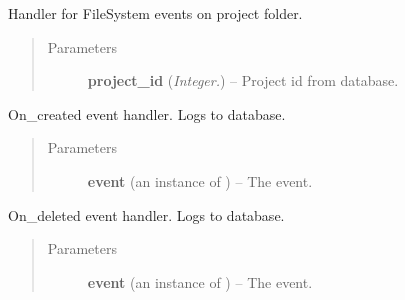 \documentclass[letterpaper,10pt,english]{sphinxmanual}
\begin{document}
\begin{fulllineitems}
\label{api:controller.PROJECT_FILE_EVENT_HANDLER}
Handler for FileSystem events on project folder.
\begin{quote}\begin{description}
\item[{Parameters}] \leavevmode
\textbf{project\_id} (\emph{Integer.}) -- Project id from database.

\end{description}\end{quote}

\begin{fulllineitems}
\label{api:controller.PROJECT_FILE_EVENT_HANDLER.on_created}
On\_created event handler. Logs to database.
\begin{quote}\begin{description}
\item[{Parameters}] \leavevmode
\textbf{event} (an instance of ) -- The event.

\end{description}\end{quote}

\end{fulllineitems}


\begin{fulllineitems}
\label{api:controller.PROJECT_FILE_EVENT_HANDLER.on_deleted}
On\_deleted event handler. Logs to database.
\begin{quote}\begin{description}
\item[{Parameters}] \leavevmode
\textbf{event} (an instance of ) -- The event.

\end{description}\end{quote}

\end{fulllineitems}



\end{fulllineitems}
\end{document}
